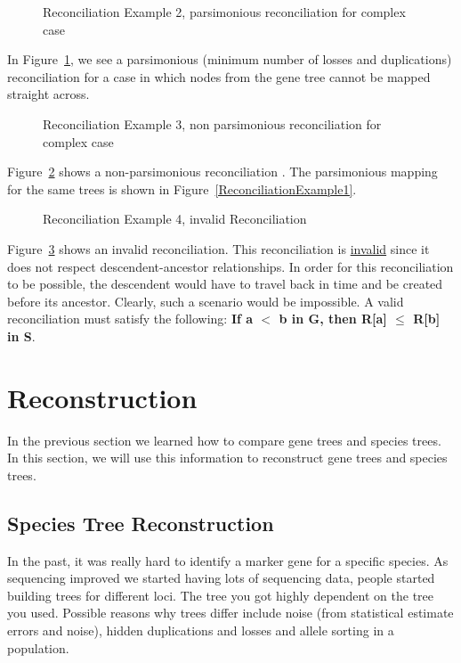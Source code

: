 \begin{figure}[H]
  \centering
  \caption{Reconciliation Example 2, parsimonious reconciliation for complex case} 
  \label{ReconciliationExample2}
\end{figure}
\noindent In Figure~\ref{ReconciliationExample2}, we see a parsimonious (minimum number of losses and duplications) reconciliation for a case in which nodes from the gene tree cannot be mapped straight across.  

\begin{figure}[H]
  \centering
  \caption{Reconciliation Example 3, non parsimonious reconciliation for complex case} 
  \label{ReconciliationExample3}
\end{figure}
\noindent Figure~\ref{ReconciliationExample3} shows a non-parsimonious reconciliation . The parsimonious mapping for the same trees is shown in Figure~\ref{ReconciliationExample1}.

\begin{figure}[H]
  \centering
  \caption{Reconciliation Example 4, invalid Reconciliation} 
  \label{ReconciliationExample4}
\end{figure}
\noindent Figure~\ref{ReconciliationExample4}  shows an invalid reconciliation. This reconciliation is \underline{invalid} since it does not respect descendent-ancestor relationships. In order for this reconciliation to be possible, the descendent would have to travel back in time and be created before its ancestor. Clearly, such a scenario would be impossible. A valid reconciliation must satisfy the following: {\bf If a $<$ b in G, then R[a] $\le$ R[b] in S}.

\section{Reconstruction}
In the previous section we learned how  to compare gene trees and species trees. In this section, we will use this information to reconstruct gene trees and species trees. 

\subsection{Species Tree Reconstruction}
In the past, it was really hard to identify a marker gene for a specific species. As sequencing improved we started having lots of sequencing data, people started building trees for different loci. The tree you got highly dependent on the tree you used. Possible reasons why trees differ include noise (from statistical estimate errors and noise), hidden duplications and losses and allele sorting in a population.

